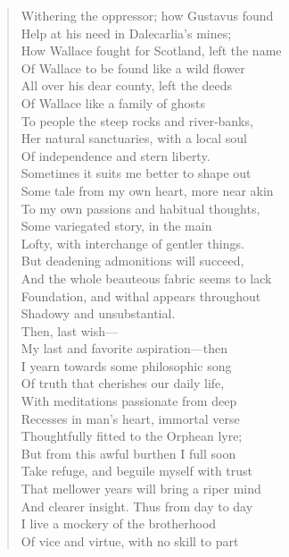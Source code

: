 \begin{verse}
Withering the oppressor; how Gustavus found  \\
Help at his need in Dalecarlia's mines;  \\
How Wallace fought for Scotland, left the name  \\
Of Wallace to be found like a wild flower	  \\
All over his dear county, left the deeds  \\
Of Wallace like a family of ghosts  \\
To people the steep rocks and river-banks,  \\
Her natural sanctuaries, with a local soul  \\
Of independence and stern liberty.	  \\
Sometimes it suits me better to shape out  \\
Some tale from my own heart, more near akin  \\
To my own passions and habitual thoughts,  \\
Some variegated story, in the main  \\
Lofty, with interchange of gentler things.	  \\
But deadening admonitions will succeed,  \\
And the whole beauteous fabric seems to lack  \\
Foundation, and withal appears throughout  \\
Shadowy and unsubstantial.  \\
Then, last wish---	  \\
My last and favorite aspiration---then  \\
I yearn towards some philosophic song  \\
Of truth that cherishes our daily life,  \\
With meditations passionate from deep  \\
Recesses in man's heart, immortal verse	  \\
Thoughtfully fitted to the Orphean lyre;  \\
But from this awful burthen I full soon  \\
Take refuge, and beguile myself with trust  \\
That mellower years will bring a riper mind  \\
And clearer insight. Thus from day to day	  \\
I live a mockery of the brotherhood  \\
Of vice and virtue, with no skill to part  \\

\end{verse}
